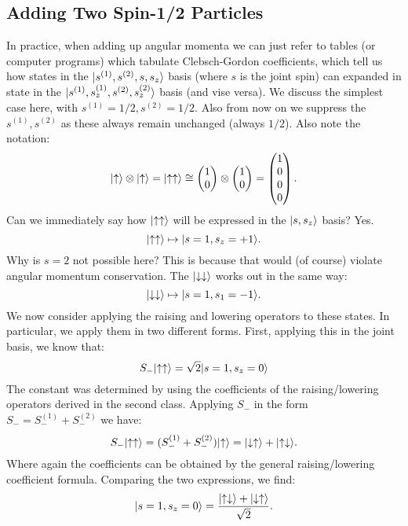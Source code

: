\subsection{Adding Two Spin-1/2 Particles}
In practice, when adding up angular momenta we can just refer to tables (or computer programs) which tabulate Clebsch-Gordon coefficients, which tell us how states in the $\lvert s^{(1)}, s^{(2)}, s, s_z \rangle$ basis (where $s$ is the joint spin) can  expanded in state in the $\lvert s^{(1)}, s_z^{(1)}, s^{(2)}, s_z^{(2)} \rangle$ basis (and vise versa). We discuss the simplest case here, with $s^{(1)} = 1/2, s^{(2)} = 1/2$. Also from now on we suppress the $s^{(1)}, s^{(2)}$ as these always remain unchanged (always $1/2$). Also note the notation:
\begin{equation}
    \lvert \uparrow \rangle \otimes \lvert \uparrow \rangle = \lvert \uparrow\uparrow \rangle \cong \begin{pmatrix}1\\0\end{pmatrix} \otimes \begin{pmatrix}1\\0\end{pmatrix} = \begin{pmatrix}1\\0\\0\\0\end{pmatrix}.
\end{equation}
Can we immediately say how $\lvert \uparrow\uparrow \rangle$ will be expressed in the $\lvert s, s_z \rangle$ basis? Yes. 
\begin{equation}
    \lvert \uparrow \uparrow \rangle \mapsto \lvert s = 1, s_z = + 1 \rangle.
\end{equation}
Why is $s = 2$ not possible here? This is because that would (of course) violate angular momentum conservation. The $\lvert \downarrow\downarrow \rangle$ works out in the same way:
\begin{equation}
    \lvert \downarrow\downarrow \rangle \mapsto \lvert s = 1, s_1 = -1 \rangle.
\end{equation}
We now consider applying the raising and lowering operators to these states. In particular, we apply them in two different forms. First, applying this in the joint basis, we know that:
\begin{equation}
    S_-\lvert \uparrow\uparrow \rangle = \sqrt{2}\lvert s = 1, s_z = 0 \rangle
\end{equation}
The constant was determined by using the coefficients of the raising/lowering operators derived in the second class. Applying $S_-$ in the form $S_- = S_-^{(1)} + S_-^{(2)}$ we have:
\begin{equation}
    S_-\lvert \uparrow\uparrow \rangle = (S_-^{(1)} + S_-^{(2)})\lvert \uparrow \rangle = \lvert \downarrow\uparrow \rangle + \lvert \uparrow\downarrow \rangle.
\end{equation}
Where again the coefficients can be obtained by the general raising/lowering coefficient formula. Comparing the two expressions, we find:
\begin{equation}
    \lvert s = 1, s_z = 0 \rangle = \frac{\lvert \uparrow\downarrow \rangle + \lvert \downarrow\uparrow \rangle}{\sqrt{2}}.
\end{equation}

